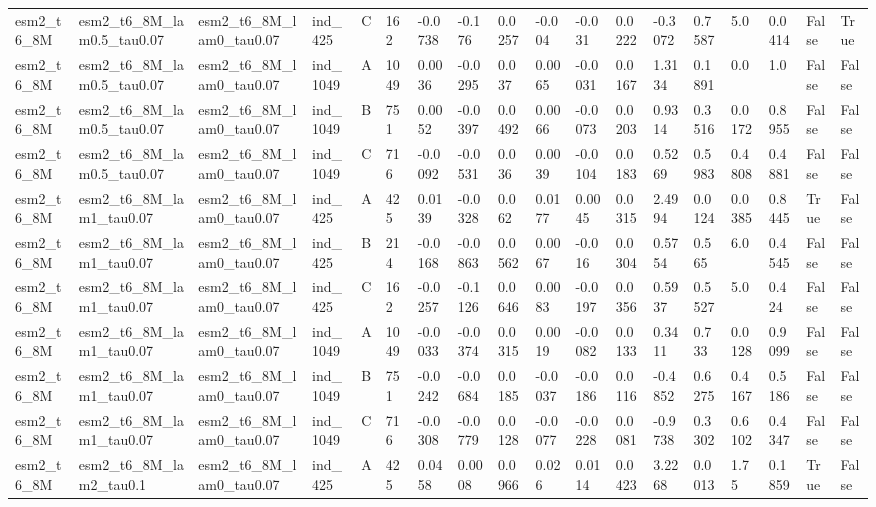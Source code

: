 \begin{table}[ht]
\begin{tabular}{llllllllllllllllll}
esm2\_t6\_8M & esm2\_t6\_8M\_lam0.5\_tau0.07 & esm2\_t6\_8M\_lam0\_tau0.07 & ind\_425 & C & 162 & -0.0738 & -0.176 & 0.0257 & -0.004 & -0.031 & 0.0222 & -0.3072 & 0.7587 & 5.0 & 0.0414 & False & True \\
esm2\_t6\_8M & esm2\_t6\_8M\_lam0.5\_tau0.07 & esm2\_t6\_8M\_lam0\_tau0.07 & ind\_1049 & A & 1049 & 0.0036 & -0.0295 & 0.037 & 0.0065 & -0.0031 & 0.0167 & 1.3134 & 0.1891 & 0.0 & 1.0 & False & False \\
esm2\_t6\_8M & esm2\_t6\_8M\_lam0.5\_tau0.07 & esm2\_t6\_8M\_lam0\_tau0.07 & ind\_1049 & B & 751 & 0.0052 & -0.0397 & 0.0492 & 0.0066 & -0.0073 & 0.0203 & 0.9314 & 0.3516 & 0.0172 & 0.8955 & False & False \\
esm2\_t6\_8M & esm2\_t6\_8M\_lam0.5\_tau0.07 & esm2\_t6\_8M\_lam0\_tau0.07 & ind\_1049 & C & 716 & -0.0092 & -0.0531 & 0.036 & 0.0039 & -0.0104 & 0.0183 & 0.5269 & 0.5983 & 0.4808 & 0.4881 & False & False \\
esm2\_t6\_8M & esm2\_t6\_8M\_lam1\_tau0.07 & esm2\_t6\_8M\_lam0\_tau0.07 & ind\_425 & A & 425 & 0.0139 & -0.0328 & 0.062 & 0.0177 & 0.0045 & 0.0315 & 2.4994 & 0.0124 & 0.0385 & 0.8445 & True & False \\
esm2\_t6\_8M & esm2\_t6\_8M\_lam1\_tau0.07 & esm2\_t6\_8M\_lam0\_tau0.07 & ind\_425 & B & 214 & -0.0168 & -0.0863 & 0.0562 & 0.0067 & -0.016 & 0.0304 & 0.5754 & 0.565 & 6.0 & 0.4545 & False & False \\
esm2\_t6\_8M & esm2\_t6\_8M\_lam1\_tau0.07 & esm2\_t6\_8M\_lam0\_tau0.07 & ind\_425 & C & 162 & -0.0257 & -0.1126 & 0.0646 & 0.0083 & -0.0197 & 0.0356 & 0.5937 & 0.5527 & 5.0 & 0.424 & False & False \\
esm2\_t6\_8M & esm2\_t6\_8M\_lam1\_tau0.07 & esm2\_t6\_8M\_lam0\_tau0.07 & ind\_1049 & A & 1049 & -0.0033 & -0.0374 & 0.0315 & 0.0019 & -0.0082 & 0.0133 & 0.3411 & 0.733 & 0.0128 & 0.9099 & False & False \\
esm2\_t6\_8M & esm2\_t6\_8M\_lam1\_tau0.07 & esm2\_t6\_8M\_lam0\_tau0.07 & ind\_1049 & B & 751 & -0.0242 & -0.0684 & 0.0185 & -0.0037 & -0.0186 & 0.0116 & -0.4852 & 0.6275 & 0.4167 & 0.5186 & False & False \\
esm2\_t6\_8M & esm2\_t6\_8M\_lam1\_tau0.07 & esm2\_t6\_8M\_lam0\_tau0.07 & ind\_1049 & C & 716 & -0.0308 & -0.0779 & 0.0128 & -0.0077 & -0.0228 & 0.0081 & -0.9738 & 0.3302 & 0.6102 & 0.4347 & False & False \\
esm2\_t6\_8M & esm2\_t6\_8M\_lam2\_tau0.1 & esm2\_t6\_8M\_lam0\_tau0.07 & ind\_425 & A & 425 & 0.0458 & 0.0008 & 0.0966 & 0.026 & 0.0114 & 0.0423 & 3.2268 & 0.0013 & 1.75 & 0.1859 & True & False \\

\end{tabular}
\end{table}
